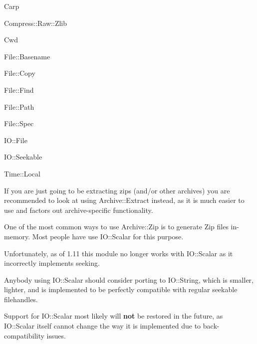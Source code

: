 \documentclass[]{article}
\let\realtextbf=\textbf
\renewcommand{\textbf}[1]{\textcolor{boldcolor}{\realtextbf{#1}}}
\begin{document}
Carp

Compress::Raw::Zlib

Cwd

File::Basename

File::Copy

File::Find

File::Path

File::Spec

IO::File

IO::Seekable

Time::Local



If you are just going to be extracting zips (and/or other archives) you
are recommended to look at using Archive::Extract instead, as it is much
easier to use and factors out archive-specific functionality.


One of the most common ways to use Archive::Zip is to generate Zip files
in-memory. Most people have use IO::Scalar for this purpose.

Unfortunately, as of 1.11 this module no longer works with IO::Scalar as
it incorrectly implements seeking.

Anybody using IO::Scalar should consider porting to IO::String, which is
smaller, lighter, and is implemented to be perfectly compatible with
regular seekable filehandles.

Support for IO::Scalar most likely will \textbf{not} be restored in the
future, as IO::Scalar itself cannot change the way it is implemented due
to back-compatibility issues.
\end{document}
